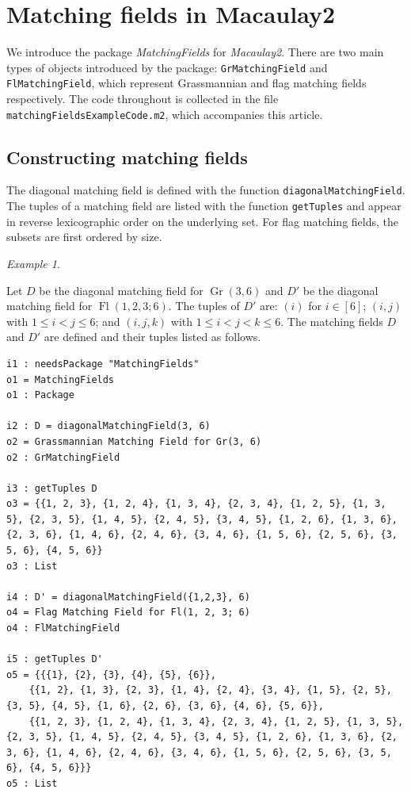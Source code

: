\documentclass[11pt]{article}
\DeclareMathOperator{\Fl}{Fl}
\DeclareMathOperator{\Gr}{Gr}
\theoremstyle{plain}
\theoremstyle{definition}
\theoremstyle{remark}
\newtheorem{example}[theorem]{Example}
\begin{document}
\section{Matching fields in Macaulay2}\label{sec: M2}

We introduce the package \textit{MatchingFields} for \textit{Macaulay2}. There are two main types of objects introduced by the package: \texttt{GrMatchingField} and \texttt{FlMatchingField}, which represent Grassmannian and flag matching fields respectively. The code throughout is collected in the file \texttt{matchingFieldsExampleCode.m2}, which accompanies this article.

\subsection{Constructing matching fields}\label{sec: defining MFs}

The diagonal matching field is defined with the function \texttt{diagonalMatchingField}. The tuples of a matching field are listed with the function \texttt{getTuples} and appear in reverse lexicographic order on the underlying set. For flag matching fields, the subsets are first ordered by size.

\begin{example}\label{example: diag mf construction}

    Let $D$ be the diagonal matching field for $\Gr(3,6)$
    and $D'$ be the diagonal matching field for $\Fl(1,2,3; 6)$. The tuples of $D'$ are: $(i)$ for $i \in [6]$; $(i,j)$ with $1 \le i < j \le 6$; and $(i,j,k)$ with $1 \le i < j < k \le 6$. The matching fields $D$ and $D'$ are defined and their tuples listed as follows.

\begin{lstlisting}[caption = {Diagonal matching field}]
i1 : needsPackage "MatchingFields"
o1 = MatchingFields
o1 : Package

i2 : D = diagonalMatchingField(3, 6)
o2 = Grassmannian Matching Field for Gr(3, 6)
o2 : GrMatchingField

i3 : getTuples D
o3 = {{1, 2, 3}, {1, 2, 4}, {1, 3, 4}, {2, 3, 4}, {1, 2, 5}, {1, 3, 5}, {2, 3, 5}, {1, 4, 5}, {2, 4, 5}, {3, 4, 5}, {1, 2, 6}, {1, 3, 6}, {2, 3, 6}, {1, 4, 6}, {2, 4, 6}, {3, 4, 6}, {1, 5, 6}, {2, 5, 6}, {3, 5, 6}, {4, 5, 6}}
o3 : List

i4 : D' = diagonalMatchingField({1,2,3}, 6)
o4 = Flag Matching Field for Fl(1, 2, 3; 6)
o4 : FlMatchingField

i5 : getTuples D'
o5 = {{{1}, {2}, {3}, {4}, {5}, {6}}, 
    {{1, 2}, {1, 3}, {2, 3}, {1, 4}, {2, 4}, {3, 4}, {1, 5}, {2, 5}, {3, 5}, {4, 5}, {1, 6}, {2, 6}, {3, 6}, {4, 6}, {5, 6}}, 
    {{1, 2, 3}, {1, 2, 4}, {1, 3, 4}, {2, 3, 4}, {1, 2, 5}, {1, 3, 5}, {2, 3, 5}, {1, 4, 5}, {2, 4, 5}, {3, 4, 5}, {1, 2, 6}, {1, 3, 6}, {2, 3, 6}, {1, 4, 6}, {2, 4, 6}, {3, 4, 6}, {1, 5, 6}, {2, 5, 6}, {3, 5, 6}, {4, 5, 6}}}
o5 : List
\end{lstlisting}
\end{example}
\end{document}
